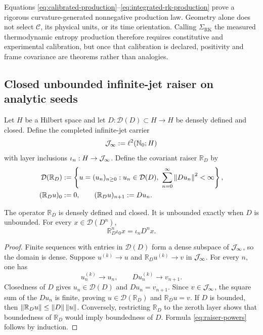 \begin{remark}
Equations \eqref{eq:calibrated-production}--\eqref{eq:integrated-rk-production} prove a rigorous curvature-generated nonnegative production law.  Geometry alone does not select $\mathcal C$, its physical units, or its time orientation.  Calling $\Sigma_{\mathrm{RK}}$ the measured thermodynamic entropy production therefore requires constitutive and experimental calibration, but once that calibration is declared, positivity and frame covariance are theorems rather than analogies.
\end{remark}

\subsection{Closed unbounded infinite-jet raiser on analytic seeds}

Let $H$ be a Hilbert space and let $D:\mathcal D(D)\subset H\to H$ be densely defined and closed.  Define the completed infinite-jet carrier
\[
\mathcal J_\infty:=\ell^2(\mathbb N_0;H)
\]
with layer inclusions $\iota_n:H\to\mathcal J_\infty$.  Define the covariant raiser $\mathbb R_D$ by
\begin{align}
\mathcal D(\mathbb R_D)
&:=\left\{u=(u_n)_{n\ge0}:
 u_n\in\mathcal D(D),\ 
 \sum_{n=0}^\infty\norm{Du_n}^2<\infty\right\},
\label{eq:unbounded-raiser-domain}\\
(\mathbb R_Du)_0&:=0,
\qquad
(\mathbb R_Du)_{n+1}:=Du_n.
\label{eq:unbounded-raiser}
\end{align}

\begin{lemma}
The operator $\mathbb R_D$ is densely defined and closed.  It is unbounded exactly when $D$ is unbounded.  For every $x\in\mathcal D(D^n)$,
\begin{equation}
\mathbb R_D^n\iota_0x
=\iota_nD^nx.
\label{eq:raiser-powers}
\end{equation}
\end{lemma}

\begin{proof}
Finite sequences with entries in $\mathcal D(D)$ form a dense subspace of $\mathcal J_\infty$, so the domain is dense.  Suppose $u^{(k)}\to u$ and $\mathbb R_Du^{(k)}\to v$ in $\mathcal J_\infty$.  For every $n$, one has
\[
u_n^{(k)}\to u_n,
\qquad
Du_n^{(k)}\to v_{n+1}.
\]
Closedness of $D$ gives $u_n\in\mathcal D(D)$ and $Du_n=v_{n+1}$.  Since $v\in\mathcal J_\infty$, the square sum of the $Du_n$ is finite, proving $u\in\mathcal D(\mathbb R_D)$ and $\mathbb R_Du=v$.  If $D$ is bounded, then $\left\lVert\mathbb R_Du\right\rVert\le\left\lVert D\right\rVert\left\lVert u\right\rVert$.  Conversely, restricting $\mathbb R_D$ to the zeroth layer shows that boundedness of $\mathbb R_D$ would imply boundedness of $D$.  Formula \eqref{eq:raiser-powers} follows by induction.
\end{proof}

